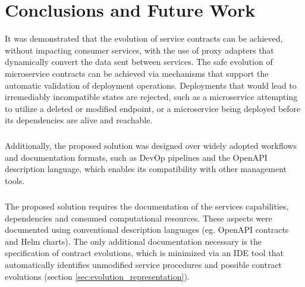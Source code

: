 
%

\chapter{Conclusions and Future Work}
\label{cha:conclusions and future work}

It was demonstrated that the evolution of service contracts can be achieved, without impacting consumer services,
with the use of proxy adapters that dynamically convert the data sent between services.
The safe evolution of microservice contracts can be achieved via mechanisms that
support the automatic validation of deployment operations.
Deployments that would lead to irremediably incompatible states are rejected, such as a
microservice attempting to utilize a deleted or modified endpoint, or a microservice being deployed before its dependencies are alive and reachable.

\paragraph{}

Additionally, the proposed solution was designed over widely adopted workflows and documentation formats, such as DevOp pipelines and the OpenAPI description language,
which enables its compatibility with other management tools.
    
\paragraph{}

The proposed solution requires the documentation of the services capabilities, dependencies and consumed computational resources.
These aspects were documented using conventional description languages (eg. OpenAPI contracts and Helm charts).
The only additional documentation necessary is the specification of contract evolutions, which is minimized
via an IDE tool that automatically identifies unmodified service procedures and possible contract evolutions (section \ref{sec:evolution_representation}).

\paragraph{}

